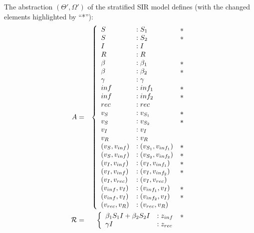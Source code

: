 \begin{example}\label{ex:abstraction}
    The abstraction $(\Theta', \Omega')$ of the stratified SIR model defines
    (with the changed elements highlighted by ``*''):
    \begin{eqnarray*}
        A &=& \left\{ 
            \begin{array}{lll}
                S &: S_1 &*\\
                S &: S_2&*\\
                I &: I\\
                R &: R\\
               \beta &: \beta_1&*\\
               \beta &: \beta_2&*\\
               \gamma &: \gamma\\
               inf&: inf_1&*\\
               inf&: inf_2&*\\
               rec&: rec\\
               v_S &: v_{S_1}&*\\
               v_S &: v_{S_2}&*\\
               v_I &: v_{I}\\
               v_R &: v_{R}\\
               (v_{S}, v_{inf}) &: (v_{S_1}, v_{inf_1})&*\\
               (v_{S}, v_{inf}) &: (v_{S_2}, v_{inf_2})&*\\
               (v_{I}, v_{inf}) &: (v_{I}, v_{inf_1})&*\\
               (v_{I}, v_{inf}) &: (v_{I}, v_{inf_2})&*\\
               (v_I, v_{rec}) &: (v_I, v_{rec})\\
               (v_{inf}, v_I) &: (v_{inf_1}, v_I)&*\\
               (v_{inf}, v_I) &: (v_{inf_2}, v_I)&*\\
               (v_{rec}, v_R) &: (v_{rec}, v_R)\\
            \end{array}\right.\\
            {\cal R} &=& \left\{ 
            \begin{array}{lll}
                \beta_1 S_1 I +  \beta_2 S_2 I& : z_{inf}&* \\
                \gamma I  & : z_{rec}\\
            \end{array}\right.\\
    \end{eqnarray*}
\end{example}

